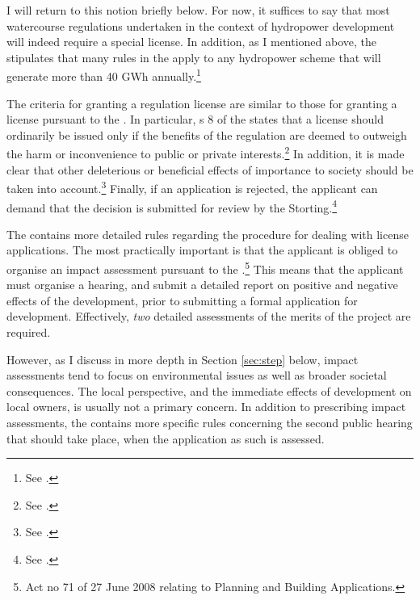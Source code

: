 I will return to this notion briefly below. For now, it suffices to say that most watercourse regulations undertaken in the context of hydropower development will indeed require a special license. In addition, as I mentioned above, the \cite{wra00} stipulates that many rules in the \cite{wra17} apply to any hydropower scheme that will generate more than 40 GWh annually.\footnote{See \cite[19]{wra00}.}

The criteria for granting a regulation license are similar to those for granting a license pursuant to the \cite{wra00}. In particular, s 8 of the \cite{wra17} states that a license should ordinarily be issued only if the benefits of the regulation are deemed to outweigh the harm or inconvenience to public or private interests.\footnote{See \cite[8]{wra17}.} In addition, it is made clear that other deleterious or beneficial effects of importance to society should be taken into account.\footnote{See \cite[8]{wra17}.} Finally, if an application is rejected, the applicant can demand that the decision is submitted for review by the Storting.\footnote{See \cite[8]{wra17}.}

The \cite{wra17} contains more detailed rules regarding the procedure for dealing with license applications. The most practically important is that the applicant is obliged to organise an impact assessment pursuant to the \cite{pb08}.\footnote{Act no 71 of 27 June 2008 relating to Planning and Building Applications.} This means that the applicant must organise a hearing, and submit a detailed report on positive and negative effects of the development, prior to submitting a formal application for development. Effectively, {\it two} detailed assessments of the merits of the project are required. 

However, as I discuss in more depth in Section \ref{sec:step} below, impact assessments tend to focus on environmental issues as well as broader societal consequences. The local perspective, and the immediate effects of development on local owners, is usually not a primary concern. In addition to prescribing impact assessments, the \cite{wra17} contains more specific rules concerning the second public hearing that should take place, when the application as such is assessed. 


